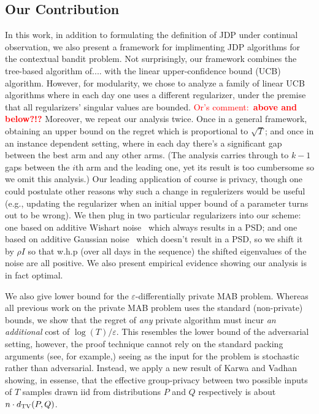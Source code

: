 \documentclass{article}
\newcommand{\os}[1]{\textcolor{red}{Or's comment:~\textbf{#1}}}
\begin{document}
\subsection{Our Contribution}
\label{sec:contributions}

In this work, in addition to formulating the definition of JDP under continual observation, we also present a framework for implimenting JDP algorithms for the contextual bandit problem. Not surprisingly, our framework combines the tree-based algorithm of.... with the linear upper-confidence bound (UCB) algorithm. However, for modularity, we chose to analyze a family of linear UCB algorithms where in each day one uses a different regularizer, under the premise that all regularizers' singular values are bounded. \os{above and below?!?} Moreover, we repeat our analysis twice. Once in a general framework, obtaining an upper bound on the regret which is proportional to $\sqrt T$; and once in an instance dependent setting, where in each day there's a significant gap between the best arm and any other arms. (The analysis carries through to $k-1$ gaps between the $i$th arm and the leading one, yet its result is too cumbersome so we omit this analysis.)  Our leading application of course is privacy, though one could postulate other reasons why such a change in regulerizers would be useful (e.g., updating the regularizer when an initial upper bound of a parameter turns out to be wrong). We then plug in two particular regularizers into our scheme: one based on additive Wishart noise~\cite{Sheffet15} which always results in a PSD; and one based on additive Gaussian noise~\cite{DworkTTZ14} which doesn't result in a PSD, so we shift it by $\rho I$ so that w.h.p (over all days in the sequence) the shifted eigenvalues of the noise are all positive. We also present empirical evidence showing our analysis is in fact optimal.

We also give lower bound for the $\varepsilon$-differentially private MAB problem. Whereas all previous work on the private MAB problem uses the standard (non-private) bounds, we show that the regret of \emph{any} private algorithm must incur \emph{an additional} cost of $\log(T)/\varepsilon$. This resembles the lower bound of the adversarial setting, however, the proof technique cannot rely on the standard packing arguments (see, for example,\cite{HardtTalware10}) seeing as the input for the problem is stochastic rather than adversarial. Instead, we apply a new result of Karwa and Vadhan~\cite{KarwaFiniteSampleDifferentially2017} showing, in essense, that the effective group-privacy between two possible inputs of $T$ samples drawn iid from distributions $P$ and $Q$ respectively is about $n\cdot d_{\rm TV}(P,Q)$.
\end{document}
